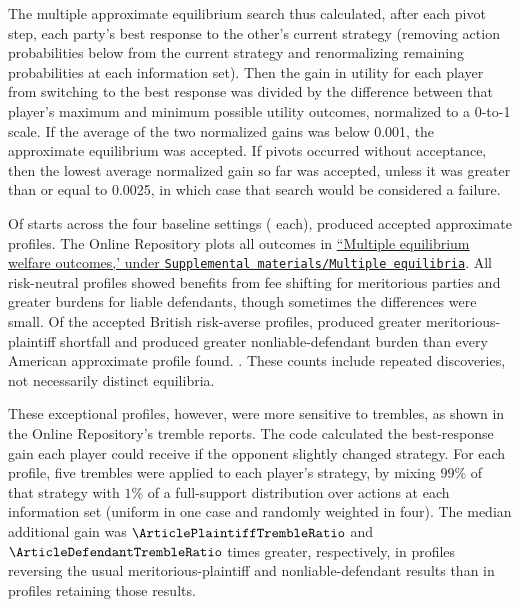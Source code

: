 \documentclass{article}
\begin{document}
The multiple approximate equilibrium search thus calculated, after each pivot step, each party's best response to the other's current strategy (removing action probabilities below \ArticleRoundingCutoff{} from the current strategy and renormalizing remaining probabilities at each information set). Then the gain in utility for each player from switching to the best response was divided by the difference between that player’s maximum and minimum possible utility outcomes, normalized to a 0-to-1 scale. If the average of the two normalized gains was below 0.001, the approximate equilibrium was accepted. If \ArticlePivotLimit{} pivots occurred without acceptance, then the lowest average normalized gain so far was accepted, unless it was greater than or equal to 0.0025, in which case that search would be considered a failure.

Of \ArticleAttemptedStarts{} starts across the four baseline settings (\ArticleStartsPerCore{} each), \ArticleAcceptedStarts{} produced accepted approximate profiles. The Online Repository plots all outcomes in \href{https://github.com/mbabramo/correlated-signals-article/blob/main/Supplemental\%20materials/Multiple\%20equilibria/Multiple\%20equilibrium\%20welfare\%20outcomes.pdf}{``Multiple equilibrium welfare outcomes,' under \texttt{Supplemental materials/Multiple equilibria}}. All risk-neutral profiles showed benefits from fee shifting for meritorious parties and greater burdens for liable defendants, though sometimes the differences were small. Of the \ArticleAcceptedBritishRa{} accepted British risk-averse profiles, \ArticlePlaintiffReversals{} produced greater meritorious-plaintiff shortfall and \ArticleDefendantReversals{} produced greater nonliable-defendant burden than every American approximate profile found. \ArticleBothReversalsSentence{}. These counts include repeated discoveries, not necessarily distinct equilibria.

These exceptional profiles, however, were more sensitive to trembles, as shown in the Online Repository's tremble reports. The code calculated the best-response gain each player could receive if the opponent slightly changed strategy. For each profile, five trembles were applied to each player’s strategy, by mixing $99\%$ of that strategy with $1\%$ of a full-support distribution over actions at each information set (uniform in one case and randomly weighted in four). The median additional gain was $\ArticlePlaintiffTrembleRatio$ and $\ArticleDefendantTrembleRatio$ times greater, respectively, in profiles reversing the usual meritorious-plaintiff and nonliable-defendant results than in profiles retaining those results.
\end{document}
